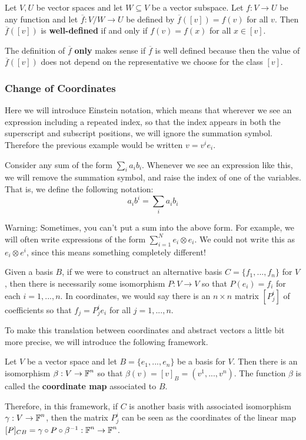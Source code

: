\begin{defn} 
    Let $V,U$ be vector spaces and let $W\subseteq V$ be a vector subspace. Let $f : V \to U$ be any function and let $\overline{f} : V/W \to U$ be defined by $\overline{f}([v]) = f(v)$ for all $v$. Then $\overline{f}([v])$ is \textbf{well-defined} if and only if $f(v) = f(x)$ for all $x\in [v]$.
\end{defn}
\begin{remark*}
    The definition of $\overline{f}$ \textbf{only} makes sense if $\overline{f}$ is well defined because then the value of $\overline{f}([v])$ does not depend on the representative we choose for the class $[v]$.
\end{remark*}
\subsubsection{Change of Coordinates}

Here we will introduce Einstein notation, which means that wherever we see an expression including a repeated index, so that the index appears in both the superscript and subscript positions, we will ignore the summation symbol. Therefore the previous example would be written $v = v^i e_i$. 

\begin{defn} Consider any sum of the form $\sum_i a_i b_i$. Whenever we see an expression like this, we will remove the summation symbol, and raise the index of one of the variables. That is, we define the following notation:
\[a_i b^i = \sum_i a_i b_i\]

Warning: Sometimes, you can't put a sum into the above form. For example, we will often write expressions of the form $\sum_{i=1}^N e_i \otimes e_i$. We could not write this as $e_i \otimes e^i$, since this means something completely different!
\end{defn}

Given a basis $B$, if we were to construct an alternative basis $C=\{f_1,...,f_n\}$ for $V$, then there is necessarily some isomorphism $P : V \to V$ so that $P(e_i)=f_i$ for each $i=1,...,n$. In coordinates, we would say there is an $n\times n$ matrix $[P_j^i]$ of coefficients so that $f_j = P^i_j e_i$ for all $j=1,...,n$. 

To make this translation between coordinates and abstract vectors a little bit more precise, we will introduce the following framework. 

\begin{defn}Let $V$ be a vector space and let $B = \{e_1,...,e_n\}$ be a basis for $V$. Then there is an isomorphism $\beta : V \to \operatorname{\mathbb{F}}^n$ so that $\beta(v) = [v]_B = (v^1,...,v^n)$. The function $\beta$ is called the \textbf{coordinate map} associated to $B$.
\end{defn} 
Therefore, in this framework, if $C$ is another basis with associated isomorphism $\gamma : V \to \operatorname{\mathbb{F}}^n$, then the matrix $P^i_j$ can be seen as the coordinates of the linear map $[P]_{CB} = \gamma \circ P \circ \beta^{-1} : \operatorname{\mathbb{F}}^n \to \operatorname{\mathbb{F}}^n$. 

